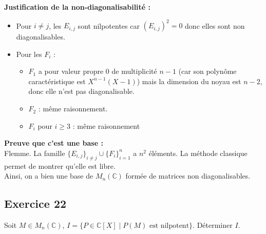 \documentclass[a4paper,12pt]{article}
\begin{document}
\begin{correctionbox}
        \vspace{0.5em}
        
        \textbf{Justification de la non-diagonalisabilité :}
        
        \begin{itemize}

        \item Pour \( i \neq j \), les \( E_{i,j} \) sont nilpotentes car \( (E_{i,j})^2 = 0 \) donc elles sont non diagonalisables.
        
        \item Pour les \( F_i \) :
          \begin{itemize}
          \item \( F_1 \) a pour valeur propre 0 de multiplicité \( n-1 \) (car son polynôme caractéristique est \( X^{n-1}(X-1) \)) mais la dimension du noyau est \( n-2 \), donc elle n'est pas diagonalisable.
          \item \( F_2 \) : même raisonnement.
          \item \( F_i \) pour \( i \geq 3 \) : même raisonnement
          \end{itemize}
        \end{itemize}
        
        \vspace{0.5em}
        
        \textbf{Preuve que c'est une base :}\\
        Flemme. La famille \( \{E_{i,j}\}_{i \neq j} \cup \{F_i\}_{i=1}^n \) a \( n^2 \) éléments. La méthode classique permet de montrer qu'elle est libre.\\
        Ainsi, on a bien une base de \( M_n(\mathbb{C}) \) formée de matrices non diagonalisables.
    \end{correctionbox}



    \subsection*{Exercice 22}
    Soit \( M \in M_n(\mathbb{C}) \), \( I = \{P \in \mathbb{C}[X] \mid P(M) \text{ est nilpotent}\} \). Déterminer \( I \).
    
\end{document}
